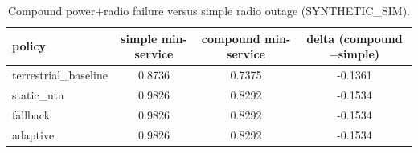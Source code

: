 \begin{table}[h]\centering
\caption{Compound power+radio failure versus simple radio outage (SYNTHETIC\_SIM).}
\begin{tabular}{lccc}\toprule
policy & simple min-service & compound min-service & delta (compound$-$simple) \\\midrule
terrestrial\_baseline & 0.8736 & 0.7375 & -0.1361 \\
static\_ntn & 0.9826 & 0.8292 & -0.1534 \\
fallback & 0.9826 & 0.8292 & -0.1534 \\
adaptive & 0.9826 & 0.8292 & -0.1534 \\
\bottomrule\end{tabular}\end{table}
